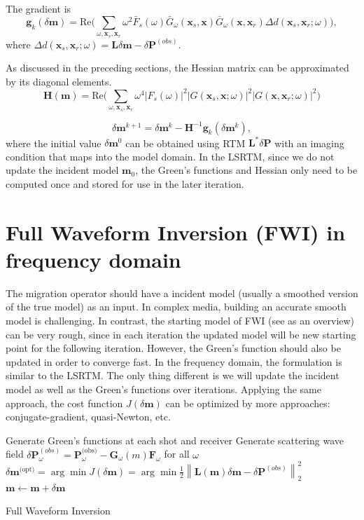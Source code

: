 \documentclass[11pt]{article}
\newcommand{\bx}{\boldsymbol{x}}
\newcommand{\bF}{\boldsymbol{F}}
\newcommand{\bG}{\boldsymbol{G}}
\newcommand{\bg}{\boldsymbol{g}}
\newcommand{\bH}{\boldsymbol{H}}
\newcommand{\bL}{\boldsymbol{L}}
\newcommand{\bm}{\boldsymbol{m}}
\newcommand{\bP}{\boldsymbol{P}}
\theoremstyle{plain}
\theoremstyle{definition}
\theoremstyle{remark}
\numberwithin{equation}{section}
\begin{document}
The gradient is 
\begin{equation}
\bg_k(\delta\bm)=\text{Re}\bigg(\sum_{\omega,\bx_s,\bx_r } \omega^2  \bar{F}_s(\omega) \bar{G}_\omega(\bx_s,\bx)\bar{ G}_\omega(\bx,\bx_r)\Delta d(\bx_s,\bx_r;\omega)\bigg), 
\end{equation}
where $\Delta d(\bx_s,\bx_r;\omega)=\bL\delta \bm - \delta\bP^{(obs)}$. 

As discussed in the preceding sections, the Hessian matrix can be approximated by its diagonal elements.
\begin{equation}
\bH(\bm)= \text{Re}\bigg( \sum_{\omega,\bx_s,\bx_r} \omega^4 |F_s(\omega)|^2 |G(\bx_s,\bx;\omega)|^2 |G(\bx,\bx_r;\omega)|^2 \bigg)
\end{equation} 

\begin{equation}
\delta \bm^{k+1}=\delta \bm^{k} - \bH^{-1} \bg_k(\delta \bm^k),
\end{equation}
where the initial value $\delta \bm^0$ can be obtained using RTM $\bL^* \delta \bP$ with an imaging condition that maps into the model domain.
In the LSRTM, since we do not update the incident model $\bm_0$, the Green's functions and Hessian only need to be computed once and stored
for use in the later iteration. 



\section{Full Waveform Inversion (FWI) in frequency domain}
The migration operator should have a incident model (usually a smoothed version of the true model) as an input. In complex media, building an accurate smooth model is challenging. In contrast, the starting model of FWI (see \cite{Virieux:2009aa} as an overview) can be very rough, since in each iteration the updated model will be new starting point for the following iteration. However, the Green's function should also be updated in order to converge fast. In the frequency domain, the formulation is similar to the LSRTM. The only thing different is we will update the incident model as well as the Green's functions over iterations. Applying the same approach, the cost function $J(\delta \bm)$ can be optimized by more approaches: conjugate-gradient, quasi-Newton, etc.

\begin{algorithm}[H]
\begin{algorithmic}[1]
\WHILE{$m(\bx)$ is not converged}
\STATE Generate Green's functions at each shot and receiver
\STATE Generate scattering wave field $\delta\bP^{(obs)}_{\omega}= \bP_{\omega}^{\text{(obs)}} - \bG_{\omega}(m)\bF_{\omega}$ for all $\omega$
\STATE $\delta \bm^{\text{(opt)}} = \arg\min J(\delta \bm) = \arg\min \frac{1}{2} \left\| \bL(\bm)\delta \bm - \delta\bP^{(obs)}\right\|_2^2$
\STATE $\bm \leftarrow \bm + \delta \bm$
\ENDWHILE
\end{algorithmic}
\caption{Full Waveform Inversion}
\end{algorithm}
\end{document}
